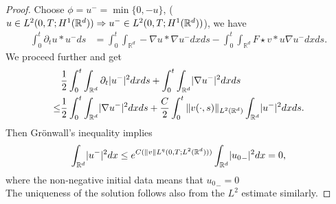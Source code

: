 \begin{proof}
     Choose $\phi  = u^{-} = \min \{0,-u\}  $, ($u \in  L^{2}(0,T;H^{1}(\mathbb{R}^d) ) \Rightarrow u^{-} \in  L^{2}(0,T;H^{1}(\mathbb{R}^d) ) $), we have 
     \begin{align*}
       \int_0^{t}  \partial_t u * u^{-} ds &= \int_0^{t}  \int_{\mathbb{R}^{d} } - \nabla u * \nabla u^{-} dx ds - \int_{0}^{t}  \int_{\mathbb{R}^{d} } F \star  v * u \nabla u^{-} dx ds 
     .\end{align*}
We proceed further and get
     \begin{align*}
       &\frac{1}{2}\int_0^{t} \int_{\mathbb{R}^{d} } \partial_t \lvert u^{-}\rvert^2 dx ds+ \int_0^{t}  \int_{\mathbb{R}^{d} } \lvert\nabla u^{-}\rvert^2 dx ds \\
       \le &\frac{1}{2}\int_0^{t}  \int_{\mathbb{R}^{d} } \lvert\nabla u^{-}\rvert^2 dx ds + \frac{C}{2} \int_0^{t} \|v(\cdot,s)\|_{L^2(\mathbb{R}^d)}\int_{\mathbb{R}^{d} }\lvert u^{-}\rvert^2 dx ds
     .\end{align*}
    Then Grönwall's inequality implies
     \begin{align*}
       \int_{\mathbb{R}^{d} } \lvert u^-\rvert^2 dx \le  e^{C(\|v\|{L^q(0,T;L^2(\mathbb{R}^d))})} \int_{\mathbb{R}^{d} } \lvert{u_{0}}_-\rvert^2 dx = 0
     ,\end{align*}
      where the non-negative initial data means that ${u_{0}}_- = 0$\\[1ex]
      
     The uniqueness of the solution follows also from the $L^2$ estimate similarly.


\end{proof}
